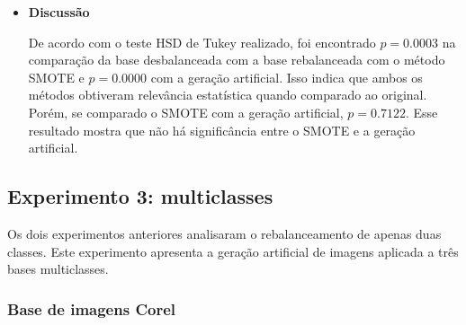 \begin{itemize}

\item[] \textbf{Discussão}

De acordo com o teste HSD de Tukey realizado, foi encontrado $p = 0.0003$ na comparação da base desbalanceada com a base rebalanceada com o método SMOTE e $p = 0.0000$ com a geração artificial. Isso indica que ambos os métodos obtiveram relevância estatística quando comparado ao original. Porém, se comparado o SMOTE com a geração artificial, $p = 0.7122$. Esse resultado mostra que não há significância entre o SMOTE e a geração artificial.

\end{itemize}

\FloatBarrier
\subsection{Experimento 3: multiclasses}

Os dois experimentos anteriores analisaram o rebalanceamento de apenas duas classes. Este experimento apresenta a geração artificial de imagens aplicada a três bases multiclasses.

\subsubsection{Base de imagens Corel}

